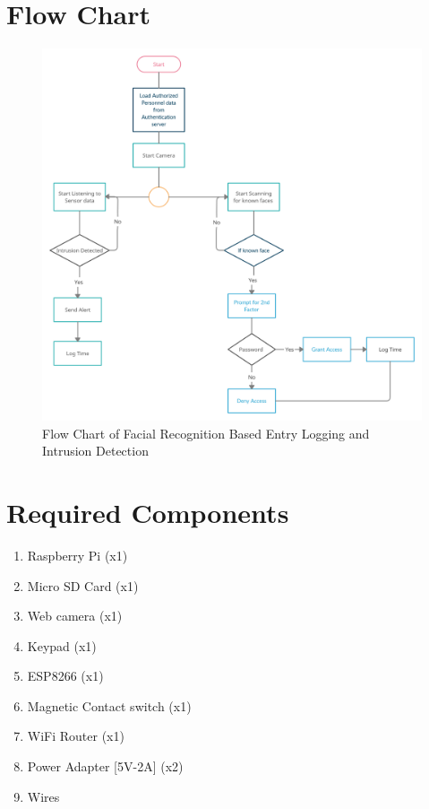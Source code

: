 \section{Flow Chart}
\begin{figure}[h!]
    \centering
    \includegraphics[width=14cm]{images/flowchart.png}
    \caption{Flow Chart of Facial Recognition Based Entry Logging and Intrusion Detection}
\end{figure}


\section{Required Components}
\begin{enumerate}
    \item Raspberry Pi (x1)
    \item Micro SD Card (x1)
    \item Web camera (x1)
    \item Keypad (x1)
    \item ESP8266 (x1)
    \item Magnetic Contact switch (x1)
    \item WiFi Router (x1)
    \item Power Adapter [5V-2A] (x2)
    \item Wires
\end{enumerate}

